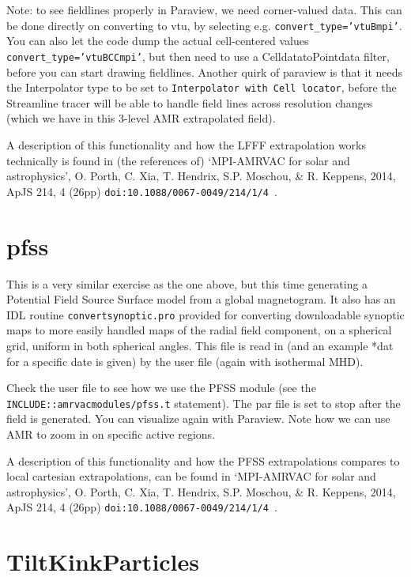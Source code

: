 \documentclass[10pt]{article}
\begin{document}
Note: to see fieldlines properly in Paraview, we need corner-valued data. This can be done directly on converting to vtu, by selecting e.g. {\tt convert\_type='vtuBmpi'}. You can also let the code dump the actual cell-centered values {\tt convert\_type='vtuBCCmpi'}, but then need to use a CelldatatoPointdata filter, before you can start drawing fieldlines. Another quirk of paraview is that it needs the Interpolator type to be set to {\tt Interpolator with Cell locator}, before the Streamline tracer will be able to handle field lines across resolution changes (which we have in this 3-level AMR extrapolated field).

A description of this functionality and how the LFFF extrapolation works technically is found in (the references of)
`MPI-AMRVAC for solar and astrophysics', O. Porth, C. Xia, T. Hendrix, S.P. Moschou, \& R. Keppens, 2014, ApJS 214, 4 (26pp) {\tt doi:10.1088/0067-0049/214/1/4 }.

\section*{pfss}

This is a very similar exercise as the one above, but this time generating a Potential Field Source Surface model from a global magnetogram. It also has an IDL routine {\tt convertsynoptic.pro} provided for converting downloadable synoptic maps to more easily handled maps of the radial field component, on a spherical grid, uniform in both spherical angles. This file is read in (and an example *dat for a specific date is given) by the user file (again with isothermal MHD).

Check the user file to see how we use the PFSS module (see the {\tt INCLUDE::amrvacmodules/pfss.t} statement). The par file is set to stop after the field is generated. You can visualize again with Paraview. Note how we can use AMR to zoom in on specific active regions.

A description of this functionality and how the PFSS extrapolations compares to local cartesian extrapolations, can be found in
`MPI-AMRVAC for solar and astrophysics', O. Porth, C. Xia, T. Hendrix, S.P. Moschou, \& R. Keppens, 2014, ApJS 214, 4 (26pp) {\tt doi:10.1088/0067-0049/214/1/4 }.

\section*{TiltKinkParticles}
\end{document}
